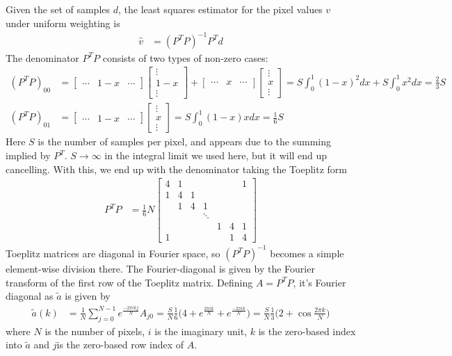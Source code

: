 \documentclass[twocolumn,apj]{aastex63}
\begin{document}
Given the set of samples $d$, the least squares estimator for the
pixel values $v$ under uniform weighting is
\begin{align}
	\hat v &= (P^TP)^{-1}P^T d
\end{align}
The denominator $P^TP$ consists of two types of non-zero cases:
\begin{align}
	(P^TP)_{00} &=
		\begin{bmatrix}\cdots & 1-x & \cdots\end{bmatrix}
		\begin{bmatrix}\vdots\\1-x\\\vdots\end{bmatrix} +
		\begin{bmatrix}\cdots & x & \cdots\end{bmatrix}
		\begin{bmatrix}\vdots\\x\\\vdots\end{bmatrix}
			= S \int_0^1 (1-x)^2 dx + S \int_0^1 x^2 dx = \frac{2}{3}S \\
	(P^TP)_{01} &=
		\begin{bmatrix}\cdots & 1-x & \cdots\end{bmatrix}
		\begin{bmatrix}\vdots\\x\\\vdots\end{bmatrix}
			= S \int_0^1 (1-x)x dx = \frac{1}{6}S
\end{align}
Here $S$ is the number of samples per pixel, and appears due to the summing implied by $P^T$.
$S\rightarrow\infty$ in the integral limit we used here,
but it will end up cancelling. With this, we end up with the denominator taking the Toeplitz form
\begin{align}
	P^TP &= \frac{1}{6}N\begin{bmatrix}
		4 & 1 &   &   &  &  & 1 \\
		1 & 4 & 1 &   &  &  & \\
			& 1 & 4 & 1 &  &  & \\
			&   &   & \ddots & & & \\
		  &   &   &   & 1 & 4 & 1 \\
		1 &   &   &   &   & 1 & 4
	\end{bmatrix}
\end{align}
Toeplitz matrices are diagonal in Fourier space, so $(P^TP)^{-1}$ becomes a simple element-wise division
there. The Fourier-diagonal is given by the Fourier transform of the first row of the Toeplitz matrix.
Defining $A = P^TP$, it's Fourier diagonal as $\tilde a$ is given by
\begin{align}
	\tilde a(k) &= \frac{1}{N} \sum_{j=0}^{N-1} e^{\frac{-2\pi ikj}{N}} A_{j0}
	= \frac{S}{N} \frac{1}{6} \Big(4 + e^{\frac{2\pi ik}{N}} + e^{\frac{-2\pi ik}{N}} \Big)
	= \frac{S}{N} \frac{1}{3} \Big(2 + \cos\frac{2\pi k}{N}\Big)
\end{align}
where $N$ is the number of pixels, $i$ is the imaginary unit, $k$ is the zero-based index into $\tilde a$
and $j$is the zero-based row index of $A$.
\end{document}
